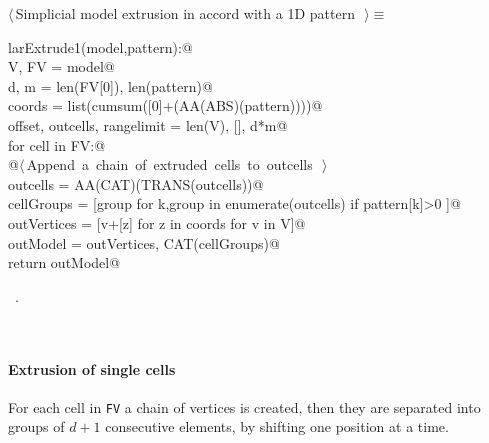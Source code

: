 \documentclass[11pt,oneside]{article}	%
\begin{document}
\begin{flushleft} \small
\begin{minipage}{\linewidth} \label{scrap1}
$\langle\,$Simplicial model extrusion in accord with a 1D pattern\nobreak\ {\footnotesize {}}$\,\rangle\equiv$
\vspace{-1ex}
\begin{list}{}{} \item
\mbox{}\verb@def larExtrude1(model,pattern):@\\
\mbox{}\verb@    V, FV = model@\\
\mbox{}\verb@    d, m = len(FV[0]), len(pattern)@\\
\mbox{}\verb@    coords = list(cumsum([0]+(AA(ABS)(pattern))))@\\
\mbox{}\verb@    offset, outcells, rangelimit = len(V), [], d*m@\\
\mbox{}\verb@    for cell in FV:@\\
\mbox{}\verb@        @\hbox{$\langle\,$Append a chain of extruded cells to outcells\nobreak\ {\footnotesize {}}$\,\rangle$}\verb@@\\
\mbox{}\verb@    outcells = AA(CAT)(TRANS(outcells))@\\
\mbox{}\verb@    cellGroups = [group for k,group in enumerate(outcells) if pattern[k]>0 ]@\\
\mbox{}\verb@    outVertices = [v+[z] for z in coords for v in V]@\\
\mbox{}\verb@    outModel = outVertices, CAT(cellGroups)@\\
\mbox{}\verb@    return outModel@\\
\mbox{}\verb@@{\NWsep}
\end{list}
\vspace{-1ex}
\footnotesize\addtolength{\baselineskip}{-1ex}
\begin{list}{}{\setlength{\itemsep}{-\parsep}\setlength{\itemindent}{-\leftmargin}}
\item \NWtxtMacroRefIn\ .
\end{list}
\end{minipage}\\[4ex]
\end{flushleft}

\paragraph{Extrusion of single cells}
For each cell in \texttt{FV} a chain of vertices is created, then they are separated into groups of $d+1$ consecutive elements, by shifting one position at a time.
\end{document}
